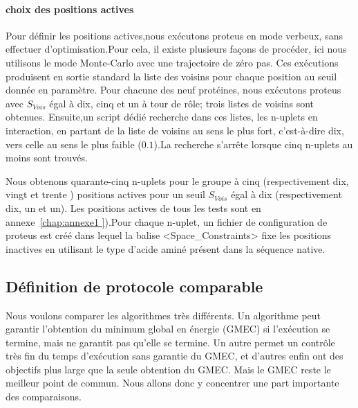 \paragraph{choix des  positions actives}
Pour définir les positions actives,nous exécutons proteus en mode verbeux, sans effectuer d'optimisation.Pour cela,
il existe plusieurs façons de procéder, ici nous utilisons le mode Monte-Carlo avec une trajectoire de zéro pas. Ces exécutions produisent en sortie standard la liste des voisins pour chaque position au seuil donnée en paramètre.
Pour chacune des neuf protéines, nous exécutons proteus avec $S_{Vois}$ égal à dix, cinq et un à tour de rôle; trois listes de voisins sont obtenues. 
Ensuite,un script dédié recherche dans ces listes, les n-uplets en interaction, en partant de la liste de voisins au sens le plus fort, c'est-à-dire dix, vers celle  au sens le plus faible ($0.1$).La recherche s'arrête lorsque cinq n-uplets au moins sont trouvés.

Nous obtenons quarante-cinq n-uplets pour le groupe à cinq (respectivement dix, vingt et trente ) positions actives pour un seuil $S_{Vois}$ égal à dix (respectivement dix, un et un). Les positions actives de tous les tests sont en annexe~\ref{chap:annexe1 }).Pour chaque n-uplet, un fichier de configuration de proteus est créé dans lequel la balise <Space\_Constraints> fixe les positions inactives en utilisant le type d'acide aminé présent dans la séquence native. 


\subsection{Définition de protocole comparable}
\label{sec:proto_compa}
Nous voulons comparer les algorithmes très différents. Un algorithme peut garantir l'obtention du minimum global en énergie (GMEC) si l'exécution se termine, mais ne garantit pas qu'elle se termine. Un autre permet un contrôle très fin du temps d'exécution sans garantie du GMEC, et d'autres enfin ont des objectifs plus large que la seule obtention du GMEC.
Mais le GMEC reste le meilleur point de commun. Nous allons donc y concentrer une part importante des comparaisons.

